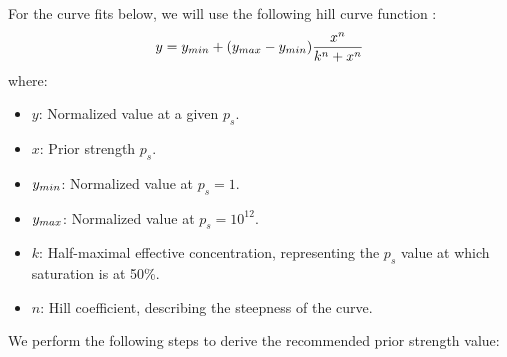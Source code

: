     For the curve fits below, we will use the following hill curve function \cite{Gesztelyi2012}:
    \[
        y = y_{\\min} + (y_{\\max} - y_{\\min}) \frac{x^n}{k^n + x^n}
    \]
    where:
        \begin{itemize}
            \item $y$: Normalized value at a given $p_s$.
            \item $x$: Prior strength $p_s$.
            \item $y_{\\min}$: Normalized value at $p_s = 1$.
            \item $y_{\\max}$: Normalized value at $p_s = 10^{12}$.
            \item $k$: Half-maximal effective concentration, representing the $p_s$ value at which saturation is at 50\%.
            \item $n$: Hill coefficient, describing the steepness of the curve.
        \end{itemize}

    We perform the following steps to derive the recommended prior strength value:

